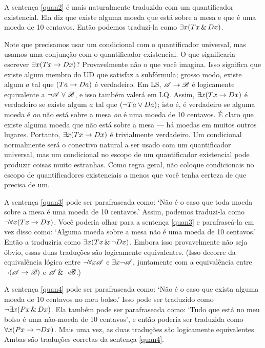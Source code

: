 A sentença \ref{quan2} é mais naturalmente traduzida com um quantificador existencial. Ela diz que existe alguma moeda que está sobre a mesa e que é uma moeda de 10 centavos. Então podemos traduzi-la como $\exists x(Tx \,\&\, Dx)$.

Note que precisamos usar um condicional com o quantificador universal, mas usamos uma conjunção com o quantificador existencial. O que significaria escrever $\exists x(Tx \rightarrow Dx)$? Provavelmente não o que você imagina. Isso significa que existe algum membro do UD que satisfaz a subfórmula; grosso modo, existe algum $a$ tal que $(Ta \rightarrow Da)$ é verdadeiro. Em LS, $\mathscr{A} \rightarrow \mathscr{B}$ é logicamente equivalente a $\neg\mathscr{A} \vee \mathscr{B}$, e isso também valerá em LQ. Assim, $\exists x(Tx \rightarrow Dx)$ é verdadeiro se existe algum $a$ tal que $(\neg Ta \vee Da)$; isto é, é verdadeiro se alguma moeda é \emph{ou} não está sobre a mesa \emph{ou} é uma moeda de 10 centavos. É claro que existe alguma moeda que não está sobre a mesa — há moedas em muitos outros lugares. Portanto, $\exists x(Tx \rightarrow Dx)$ é trivialmente verdadeiro. Um condicional normalmente será o conectivo natural a ser usado com um quantificador universal, mas um condicional no escopo de um quantificador existencial pode produzir coisas muito estranhas. Como regra geral, não coloque condicionais no escopo de quantificadores existenciais a menos que você tenha certeza de que precisa de um.

A sentença \ref{quan3} pode ser parafraseada como: `Não é o caso que toda moeda sobre a mesa é uma moeda de 10 centavos.' Assim, podemos traduzi-la como $\neg \forall x(Tx \rightarrow Dx)$. Você poderia olhar para a sentença \ref{quan3} e parafraseá-la em vez disso como: `Alguma moeda sobre a mesa não é uma moeda de 10 centavos.' Então a traduziria como $\exists x(Tx \,\&\, \neg Dx)$. Embora isso provavelmente não seja óbvio, essas duas traduções são logicamente equivalentes. (Isso decorre da equivalência lógica entre $\neg\forall x\mathscr{A}$ e $\exists x\neg\mathscr{A}$, juntamente com a equivalência entre $\neg(\mathscr{A}\rightarrow\mathscr{B})$ e $\mathscr{A}\,\&\,\neg\mathscr{B}$.)

A sentença \ref{quan4} pode ser parafraseada como: `Não é o caso que exista alguma moeda de 10 centavos no meu bolso.' Isso pode ser traduzido como $\neg\exists x(Px \,\&\, Dx)$. Ela também pode ser parafraseada como: `Tudo que está no meu bolso é uma não-moeda de 10 centavos', e então poderia ser traduzida como $\forall x(Px \rightarrow \neg Dx)$. Mais uma vez, as duas traduções são logicamente equivalentes. Ambas são traduções corretas da sentença \ref{quan4}.

